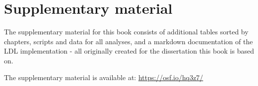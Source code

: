 \chapter{Supplementary material}\label{Supplementary Material}

The supplementary material for this book consists of additional tables sorted by chapters, scripts and data for all analyses, and a markdown documentation of the LDL implementation - all originally created for the dissertation this book is based on. 

The supplementary material is available at: \url{https://osf.io/hq3z7/}
